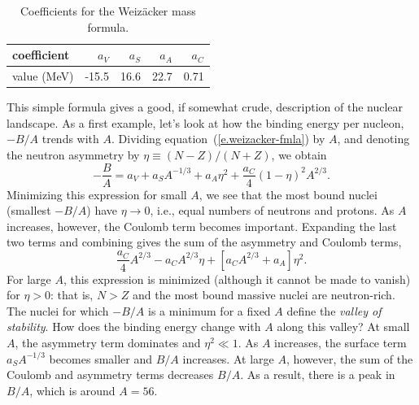 \begin{table}[htbp]
\label{t.liquid-drop}
\caption{Coefficients for the Weiz\"acker mass formula.\label{t.liquid-drop-coefficients}}
\begin{center}
\begin{tabular}{l|rrrr}
\hline
coefficient & $a_{V}$ & $a_{S}$ & $a_{A}$ & $a_{C}$\\
\hline\hline
value (MeV) & -15.5 & 16.6 & 22.7 & 0.71\\
\hline
\end{tabular}
\end{center}
\end{table}

This simple formula gives a good, if somewhat crude, description of the nuclear landscape.  As a first example,  let's look at how the binding energy per nucleon, $-B/A$ trends with $A$.  Dividing equation~(\ref{e.weizacker-fmla}) by $A$, and denoting the neutron asymmetry by $\eta \equiv (N-Z)/(N+Z)$, we obtain
\begin{equation}\label{e.binding-energy-per-nucleon}
 -\frac{B}{A} = a_{V} + a_{S} A^{-1/3} + a_{A}\eta^{2} + \frac{a_{C}}{4} \left( 1-\eta\right)^{2} A^{2/3}.
\end{equation}
Minimizing this expression for small $A$, we see that the most bound nuclei (smallest $-B/A$) have $\eta \to 0$, i.e., equal numbers of neutrons and protons.  As $A$ increases, however, the Coulomb term becomes important.  Expanding the last two terms and combining gives the sum of the asymmetry and Coulomb terms,
\[ \frac{a_{C}}{4} A^{2/3} - a_{C}A^{2/3}\eta + \left[ a_{C}A^{2/3} + a_{A} \right] \eta^{2} .\]
For large $A$, this expression is minimized (although it cannot be made to vanish) for $\eta > 0$: that is, $N>Z$ and the most bound massive nuclei are neutron-rich. The nuclei for which $-B/A$ is a minimum for a fixed $A$ define the \emph{valley of stability}. How does the binding energy change with $A$ along this valley?  At small $A$, the asymmetry term dominates and $\eta^{2}\ll 1$.  As $A$ increases, the surface term $a_{S}A^{-1/3}$ becomes smaller and $B/A$ increases.  At large $A$, however, the sum of the Coulomb and asymmetry terms decreases $B/A$.  As a result, there is a peak in $B/A$, which is around $A = 56$.

